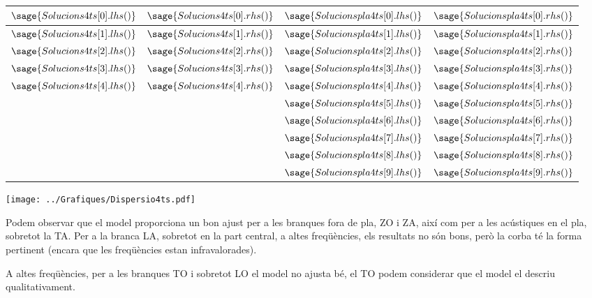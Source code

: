 \documentclass[12pt]{article} %
\begin{document}
\begin{center}
\begin{tabular}{|c|c||c|c|}\hline
$\sage{Solucions4ts[0].lhs()}$ & $\sage{Solucions4ts[0].rhs()}$ & $\sage{Solucionspla4ts[0].lhs()}$ & $\sage{Solucionspla4ts[0].rhs()}$  \\ \hline
$\sage{Solucions4ts[1].lhs()}$ & $\sage{Solucions4ts[1].rhs()}$ & $\sage{Solucionspla4ts[1].lhs()}$ & $\sage{Solucionspla4ts[1].rhs()}$  \\ \hline
$\sage{Solucions4ts[2].lhs()}$ & $\sage{Solucions4ts[2].rhs()}$ & $\sage{Solucionspla4ts[2].lhs()}$ & $\sage{Solucionspla4ts[2].rhs()}$  \\ \hline
$\sage{Solucions4ts[3].lhs()}$ & $\sage{Solucions4ts[3].rhs()}$ & $\sage{Solucionspla4ts[3].lhs()}$ & $\sage{Solucionspla4ts[3].rhs()}$  \\ \hline
$\sage{Solucions4ts[4].lhs()}$ & $\sage{Solucions4ts[4].rhs()}$ & $\sage{Solucionspla4ts[4].lhs()}$ & $\sage{Solucionspla4ts[4].rhs()}$  \\ \hline
  &  & $\sage{Solucionspla4ts[5].lhs()}$ & $\sage{Solucionspla4ts[5].rhs()}$  \\ \hline
  &  & $\sage{Solucionspla4ts[6].lhs()}$ & $\sage{Solucionspla4ts[6].rhs()}$  \\ \hline
  &  & $\sage{Solucionspla4ts[7].lhs()}$ & $\sage{Solucionspla4ts[7].rhs()}$  \\ \hline
  &  & $\sage{Solucionspla4ts[8].lhs()}$ & $\sage{Solucionspla4ts[8].rhs()}$  \\ \hline
  &  & $\sage{Solucionspla4ts[9].lhs()}$ & $\sage{Solucionspla4ts[9].rhs()}$  \\ \hline
\end{tabular}
\end{center}

\begin{center}
\texttt{[image: ../Grafiques/Dispersio4ts.pdf]}
\end{center}


Podem observar que el model  proporciona un bon ajust per a les branques fora de pla, ZO i ZA, així com per a les acústiques en el pla, sobretot la TA. Per a la branca LA, sobretot en la part central, a altes freqüències, els resultats no són bons, però la corba té la forma pertinent (encara que les freqüències estan infravalorades).

A altes freqüències, per a les branques TO i sobretot LO el model no ajusta bé, el TO podem considerar que el model el descriu qualitativament.
\end{document}
